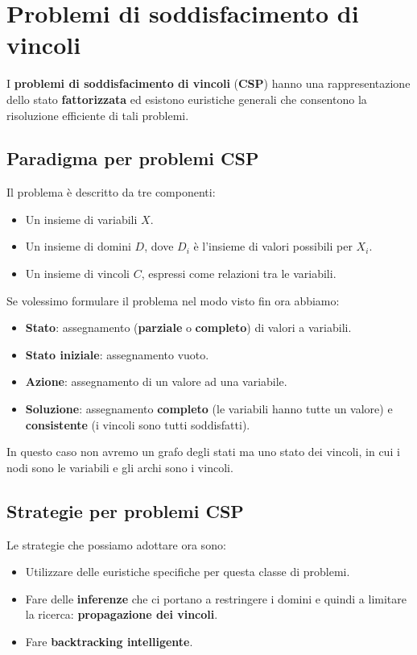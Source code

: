 \chapter{Problemi di soddisfacimento di vincoli}
I \textbf{problemi di soddisfacimento di vincoli} (\textbf{CSP}) hanno una rappresentazione dello stato
\textbf{fattorizzata} ed esistono euristiche generali che consentono la risoluzione efficiente di tali problemi.

\section{Paradigma per problemi CSP}
Il problema \`e descritto da tre componenti:
\begin{itemize}
	\item Un insieme di variabili $X$.
	\item Un insieme di domini $D$, dove $D_i$ \`e l'insieme di valori possibili per $X_i$.
	\item Un insieme di vincoli $C$, espressi come relazioni tra le variabili.
\end{itemize}
Se volessimo formulare il problema nel modo visto fin ora abbiamo:
\begin{itemize}
	\item \textbf{Stato}: assegnamento (\textbf{parziale} o \textbf{completo}) di valori a variabili.
	\item \textbf{Stato iniziale}: assegnamento vuoto.
	\item \textbf{Azione}: assegnamento di un valore ad una variabile.
	\item \textbf{Soluzione}: assegnamento \textbf{completo} (le variabili hanno tutte un valore) e
	      \textbf{consistente} (i vincoli sono tutti soddisfatti).
\end{itemize}
In questo caso non avremo un grafo degli stati ma uno stato dei vincoli, in cui i nodi sono le variabili
e gli archi sono i vincoli.

\section{Strategie per problemi CSP}
Le strategie che possiamo adottare ora sono:
\begin{itemize}
	\item Utilizzare delle euristiche specifiche per questa classe di problemi.
	\item Fare delle \textbf{inferenze} che ci portano a restringere i domini e quindi a limitare la ricerca:
	      \textbf{propagazione dei vincoli}.
	\item Fare \textbf{backtracking intelligente}.
\end{itemize}

